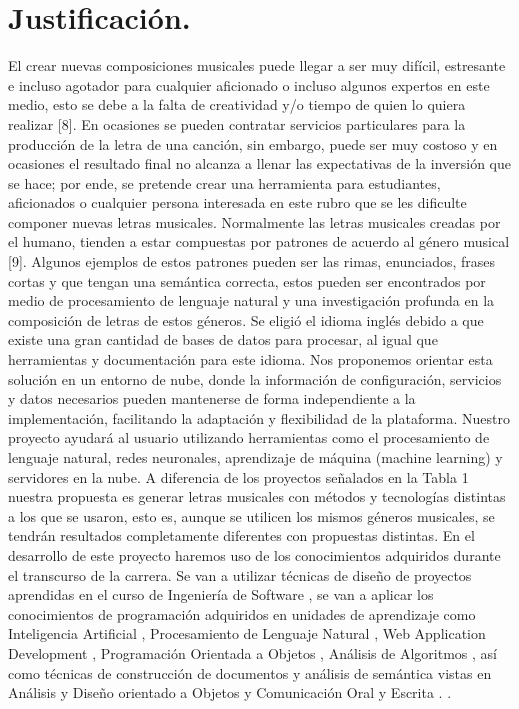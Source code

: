 \documentclass[12pt, a4paper, titlepage]{report}
\begin{document}
    	\section{Justificación.}
    	El crear nuevas composiciones musicales puede llegar a ser muy difícil, estresante e incluso agotador para cualquier aficionado o incluso algunos expertos en este medio, esto se debe a la falta de creatividad y/o tiempo de quien lo quiera realizar [8]. En ocasiones se pueden contratar servicios particulares para la producción de la letra de una canción, sin embargo, puede ser muy costoso y en ocasiones el resultado final no alcanza a llenar las expectativas de la inversión que se hace; por ende, se pretende crear una herramienta para estudiantes, aficionados o cualquier persona interesada en este rubro que se les dificulte componer nuevas letras musicales. Normalmente las letras musicales creadas por el humano, tienden a estar compuestas por patrones de acuerdo al género musical [9]. Algunos ejemplos de estos patrones pueden ser las rimas, enunciados, frases cortas y que tengan una semántica correcta, estos pueden ser encontrados por medio de procesamiento de lenguaje natural y una investigación profunda en la composición de letras de estos géneros. Se eligió el idioma inglés debido a que existe una gran cantidad de bases de datos para procesar, al igual que herramientas y documentación para este idioma. Nos proponemos orientar esta solución en un entorno de nube, donde la información de configuración, servicios y datos necesarios pueden mantenerse de forma independiente a la implementación, facilitando la adaptación y flexibilidad de la plataforma. Nuestro proyecto ayudará al usuario utilizando herramientas como el procesamiento de lenguaje natural, redes neuronales, aprendizaje de máquina (machine learning) y servidores en la nube. A diferencia de los proyectos señalados en la Tabla 1 nuestra propuesta es generar letras musicales con métodos y tecnologías distintas a los que se usaron, esto es, aunque se utilicen los mismos géneros musicales, se tendrán resultados completamente diferentes con propuestas distintas. En el desarrollo de este proyecto haremos uso de los conocimientos adquiridos durante el transcurso de la carrera. Se van a utilizar técnicas de diseño de proyectos aprendidas en el curso de Ingeniería de Software , se van a aplicar los conocimientos de programación adquiridos en unidades de aprendizaje como Inteligencia Artificial , Procesamiento de Lenguaje Natural , Web Application Development , Programación Orientada a Objetos , Análisis de Algoritmos , así como técnicas de construcción de documentos y análisis de semántica vistas en Análisis y Diseño orientado a Objetos y Comunicación Oral y Escrita . \cite{refRivestSeguridad}.
    	    
\end{document}
